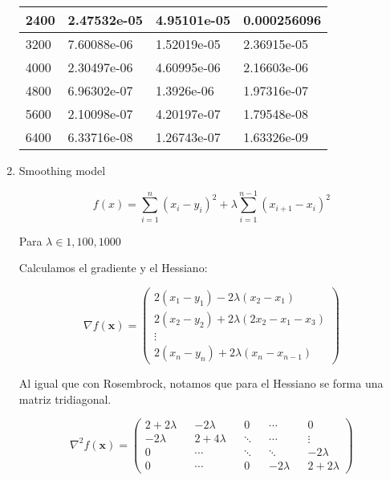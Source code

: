 \documentclass{article}
\begin{document}
\begin{enumerate}
\begin{table}[ht]
{\begin{tabular}{llll}
  \multicolumn{1}{|l|}{2400}  & \multicolumn{1}{l|}{2.47532e-05}  & \multicolumn{1}{l|}{4.95101e-05}  & \multicolumn{1}{l|}{0.000256096} \\ \hline
  \multicolumn{1}{|l|}{3200}  & \multicolumn{1}{l|}{7.60088e-06}  & \multicolumn{1}{l|}{1.52019e-05}  & \multicolumn{1}{l|}{2.36915e-05} \\ \hline
  \multicolumn{1}{|l|}{4000}  & \multicolumn{1}{l|}{2.30497e-06}  & \multicolumn{1}{l|}{4.60995e-06}  & \multicolumn{1}{l|}{2.16603e-06} \\ \hline
  \multicolumn{1}{|l|}{4800}  & \multicolumn{1}{l|}{6.96302e-07}  & \multicolumn{1}{l|}{1.3926e-06} & \multicolumn{1}{l|}{1.97316e-07} \\ \hline
  \multicolumn{1}{|l|}{5600}  & \multicolumn{1}{l|}{2.10098e-07}  & \multicolumn{1}{l|}{4.20197e-07}  & \multicolumn{1}{l|}{1.79548e-08} \\ \hline
  \multicolumn{1}{|l|}{6400}  & \multicolumn{1}{l|}{6.33716e-08}  & \multicolumn{1}{l|}{1.26743e-07}  & \multicolumn{1}{l|}{1.63326e-09} \\ \hline
  \end{tabular}
}
\end{table}

\newpage
\item Smoothing model

$$f(x) = \sum_{i=1}^{n}(x_i - y_i)^2 + \lambda \sum_{i=1}^{n-1}(x_{i+1} - x_i)^2$$

Para $\lambda \in {1, 100, 1000}$

Calculamos el gradiente y el Hessiano:

$$\nabla f(\boldsymbol{x}) = 
 \begin{pmatrix}
  2(x_1 - y_1) - 2\lambda(x_2 - x_1)\\
  2(x_2 - y_2) + 2\lambda(2x_2 - x_1 - x_3) \\
  \vdots\\
  2(x_n - y_n) + 2\lambda(x_n - x_{n-1})
 \end{pmatrix}
$$

Al igual que con Rosembrock, notamos que para el Hessiano se forma una matriz tridiagonal.


$$
\nabla^2f(\boldsymbol{x})= 
 \begin{pmatrix}
  2 + 2\lambda && - 2\lambda   && 0       && \cdots     && 0\\
  -2\lambda    && 2 + 4\lambda && \ddots  && \cdots     && \vdots\\
  0            && \cdots       && \ddots  && \ddots     && -2\lambda\\
  0            && \cdots       && 0       && -2\lambda  && 2 + 2\lambda
 \end{pmatrix}
$$


\end{enumerate}
\end{document}
